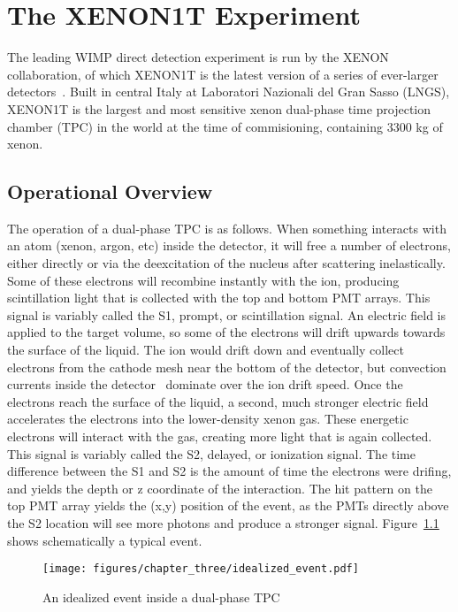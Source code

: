 

\chapter{The XENON1T Experiment}

The leading WIMP direct detection experiment is run by the XENON collaboration, of which XENON1T is the latest version of a series of ever-larger detectors~\cite{}. Built in central Italy at Laboratori Nazionali del Gran Sasso (LNGS), XENON1T is the largest and most sensitive xenon dual-phase time projection chamber (TPC) in the world at the time of commisioning, containing 3300 kg of xenon.

\section{Operational Overview}

The operation of a dual-phase TPC is as follows. When something interacts with an atom (xenon, argon, etc) inside the detector, it will free a number of electrons, either directly or via the deexcitation of the nucleus after scattering inelastically. Some of these electrons will recombine instantly with the ion, producing scintillation light that is collected with the top and bottom PMT arrays. This signal is variably called the S1, prompt, or scintillation signal. An electric field is applied to the target volume, so some of the electrons will drift upwards towards the surface of the liquid. The ion would drift down and eventually collect electrons from the cathode mesh near the bottom of the detector, but convection currents inside the detector~\cite{Shayne's paper} dominate over the ion drift speed. Once the electrons reach the surface of the liquid, a second, much stronger electric field accelerates the electrons into the lower-density xenon gas. These energetic electrons will interact with the gas, creating more light that is again collected. This signal is variably called the S2, delayed, or ionization signal. The time difference between the S1 and S2 is the amount of time the electrons were drifing, and yields the depth or z coordinate of the interaction. The hit pattern on the top PMT array yields the (x,y) position of the event, as the PMTs directly above the S2 location will see more photons and produce a stronger signal. Figure~\ref{fig:idealized_event} shows schematically a typical event.

\begin{figure}[htb]
	\texttt{[image: figures/chapter\_three/idealized\_event.pdf]}
	\caption{An idealized event inside a dual-phase TPC}
	\label{fig:idealized_event}
\end{figure}

